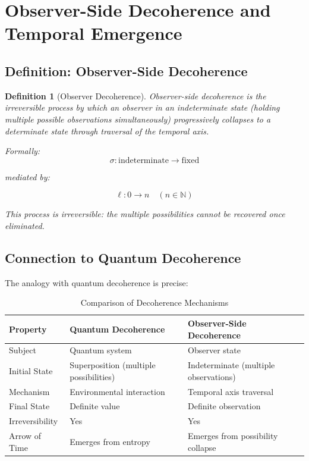 \documentclass[12pt,a4paper]{article}
\newtheorem{definition}{Definition}[section]
\begin{document}
\section{Observer-Side Decoherence and Temporal Emergence}

\subsection{Definition: Observer-Side Decoherence}

\begin{definition}[Observer Decoherence]
Observer-side decoherence is the irreversible process by which an observer in an indeterminate state (holding multiple possible observations simultaneously) progressively collapses to a determinate state through traversal of the temporal axis.

Formally:
\begin{equation}
\sigma : \text{indeterminate} \to \text{fixed}
\end{equation}

mediated by:

\begin{equation}
\ell : 0 \to n \quad (n \in \mathbb{N})
\end{equation}

This process is irreversible: the multiple possibilities cannot be recovered once eliminated.
\end{definition}

\subsection{Connection to Quantum Decoherence}

The analogy with quantum decoherence is precise:

\begin{table}[htbp]
\centering
\begin{tabularx}{\textwidth}{|l|>{\raggedright\arraybackslash}X|>{\raggedright\arraybackslash}X|}
\hline
\textbf{Property} & \textbf{Quantum Decoherence} & \textbf{Observer-Side Decoherence} \\
\hline
Subject & Quantum system & Observer state \\
\hline
Initial State & Superposition (multiple possibilities) & Indeterminate (multiple observations) \\
\hline
Mechanism & Environmental interaction & Temporal axis traversal \\
\hline
Final State & Definite value & Definite observation \\
\hline
Irreversibility & Yes & Yes \\
\hline
Arrow of Time & Emerges from entropy & Emerges from possibility collapse \\
\hline
\end{tabularx}
\caption{Comparison of Decoherence Mechanisms}
\end{table}
\end{document}
